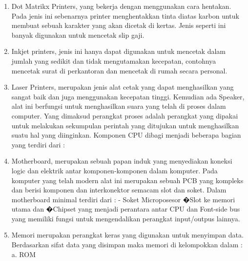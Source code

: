 \begin{enumerate}
\item Dot Matrikx Printers, yang bekerja dengan menggunakan cara hentakan. Pada jenis ini sebenarnya printer menghentakkan tinta diatas karbon untuk membuat sebuah karakter yang akan dicetak di kertas. Jenis seperti ini banyak digunakan untuk mencetak slip gaji.
\item Inkjet printers, jenis ini hanya dapat digunakan untuk mencetak dalam jumlah yang sedikit dan tidak mengutamakan kecepatan, contohnya mencetak surat di perkantoran dan mencetak di rumah secara personal.
\item Laser Printers, merupakan jenis alat cetak yang dapat menghasilkan yang sangat baik dan juga menggunakan kecepatan tinggi.
Kemudian ada Speaker, alat ini berfungsi untuk menghasilkan suara yang telah di proses dalam computer. Yang dimaksud perangkat proses adalah perangkat yang dipakai untuk melakukan sekumpulan perintah yang ditujukan untuk menghasilkan suatu hal yang diinginkan. Komponen CPU dibagi menjadi beberapa bagian yang terdiri dari :
\item Motherboard, merupakan sebuah papan induk yang menyediakan koneksi logic dan elektrik antar komponen-komponen dalam komputer. Pada komputer yang telah modern alat ini merupakan sebuah PCB yang kompleks dan berisi komponen dan interkonektor semacam slot dan soket. Dalam motherboard minimal terdiri dari : - Soket Microposesor �Slot ke memori utama dan �Chipset yang menjadi perantara antar CPU dan Font-side bus yang memiliki fungsi untuk mengendalikan perangkat input/outpus lainnya. 
\item Memori merupakan perangkat keras yang digunakan untuk menyimpan data. Berdasarkan sifat data yang disimpan maka memori di kelompokkan dalam : 
a. ROM 

\end{enumerate}
